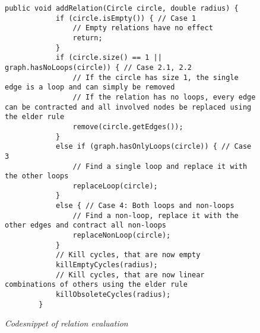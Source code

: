\lstset{language=Java}
\begin{figure}
    \begin{lstlisting}[frame=single]
        public void addRelation(Circle circle, double radius) {
            if (circle.isEmpty()) { // Case 1
                // Empty relations have no effect
                return;
            }
            if (circle.size() == 1 || graph.hasNoLoops(circle)) { // Case 2.1, 2.2
                // If the circle has size 1, the single edge is a loop and can simply be removed
                // If the relation has no loops, every edge can be contracted and all involved nodes be replaced using the elder rule
                remove(circle.getEdges());
            }
            else if (graph.hasOnlyLoops(circle)) { // Case 3
                // Find a single loop and replace it with the other loops
                replaceLoop(circle);
            }
            else { // Case 4: Both loops and non-loops
                // Find a non-loop, replace it with the other edges and contract all non-loops
                replaceNonLoop(circle);
            }
            // Kill cycles, that are now empty
            killEmptyCycles(radius);
            // Kill cycles, that are now linear combinations of others using the elder rule
            killObsoleteCycles(radius);
        }
    \end{lstlisting}
    \caption{\textit{Codesnippet of relation evaluation}}
    \label{fig6}
\end{figure}